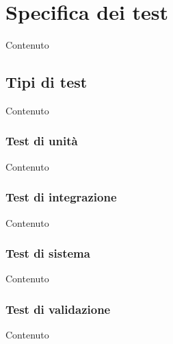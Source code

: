\section{Specifica dei test}
Contenuto

    \subsection{Tipi di test}
    Contenuto

    \subsubsection{Test di unit\`a}
    Contenuto

    \subsubsection{Test di integrazione}
    Contenuto

    \subsubsection{Test di sistema}
    Contenuto

    \subsubsection{Test di validazione}
    Contenuto
